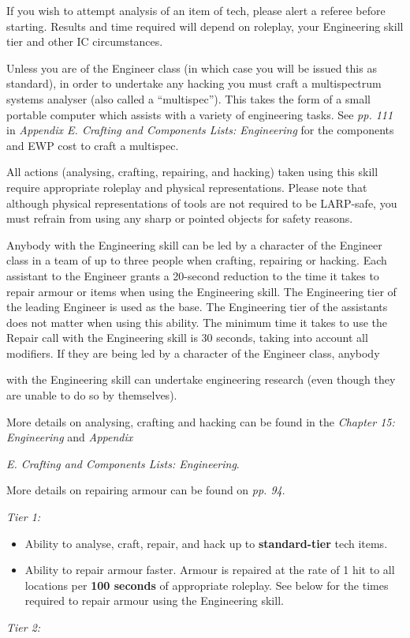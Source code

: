 \documentclass{scrbook}
\begin{document}
If you wish to attempt analysis of an item of tech, please alert a referee before starting. Results and time required will depend on roleplay, your Engineering skill tier and other IC circumstances.

Unless you are of the Engineer class (in which case you will be issued this as standard), in order to undertake any hacking you must craft a multispectrum systems analyser (also called a ``multispec''). This takes the form of a small portable computer which assists with a variety of engineering tasks. See \textit{pp. 111} in \textit{Appendix E. Crafting and Components Lists: Engineering} for the components and EWP cost to craft a multispec.

All actions (analysing, crafting, repairing, and hacking) taken using this skill require appropriate roleplay and physical representations. Please note that although physical representations of tools are not required to be LARP-safe, you must refrain from using any sharp or pointed objects for safety reasons.

Anybody with the Engineering skill can be led by a character of the Engineer class in a team of up to three people when crafting, repairing or hacking. Each assistant to the Engineer grants a 20-second reduction to the time it takes to repair armour or items when using the Engineering skill. The Engineering tier of the leading Engineer is used as the base. The Engineering tier of the assistants does not matter when using this ability. The minimum time it takes to use the Repair call with the Engineering skill is 30 seconds, taking into account all modifiers. If they are being led by a character of the Engineer class, anybody

with the Engineering skill can undertake engineering research (even though they are unable to do so by themselves).

More details on analysing, crafting and hacking can be found in the \textit{Chapter 15: Engineering} and \textit{Appendix}

\textit{E. Crafting and Components Lists: Engineering}.

More details on repairing armour can be found on \textit{pp. 94}.

\textit{Tier 1:}

\begin{itemize}
\item Ability to analyse, craft, repair, and hack up to \textbf{standard-tier} tech items.

\item Ability to repair armour faster. Armour is repaired at the rate of 1 hit to all locations per \textbf{100 seconds} of appropriate roleplay. See below for the times required to repair armour using the Engineering skill.

\end{itemize}
\textit{Tier 2:}
\end{document}

